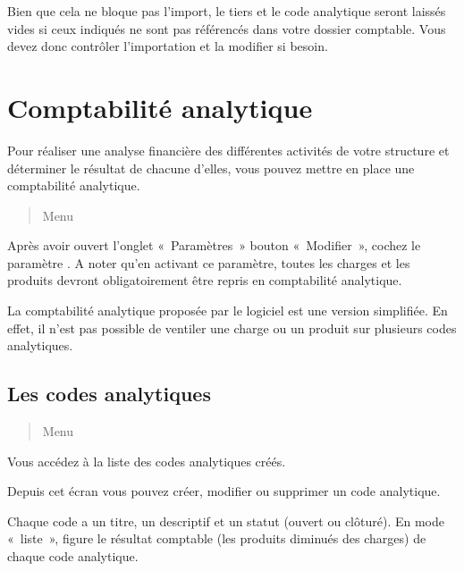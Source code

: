 \documentclass[a4paper,10pt,oneside,french]{sphinxmanual}
\begin{document}
\sphinxAtStartPar
Bien que cela ne bloque pas l’import, le tiers et le code analytique seront laissés vides si ceux indiqués ne sont pas référencés dans votre dossier comptable. Vous devez donc contrôler l’importation et la modifier si besoin.

\sphinxstepscope


\section{Comptabilité analytique}
\label{\detokenize{accounting/costaccounting:comptabilite-analytique}}\label{\detokenize{accounting/costaccounting::doc}}
\sphinxAtStartPar
Pour réaliser une analyse financière des différentes activités de votre structure et déterminer le résultat de chacune d’elles, vous pouvez mettre en place une comptabilité analytique.
\begin{quote}

\sphinxAtStartPar
Menu 
\end{quote}

\sphinxAtStartPar
Après avoir ouvert l’onglet « Paramètres » \sphinxhyphen{} bouton « Modifier », cochez le paramètre . A noter qu’en activant ce paramètre, toutes les charges et les produits devront obligatoirement être repris en comptabilité analytique.

\sphinxAtStartPar
La comptabilité analytique proposée par le logiciel est une version simplifiée. En effet, il n’est pas possible de ventiler une charge ou un produit sur plusieurs codes analytiques.


\subsection{Les codes analytiques}
\label{\detokenize{accounting/costaccounting:les-codes-analytiques}}\begin{quote}

\sphinxAtStartPar
Menu 
\end{quote}

\sphinxAtStartPar
Vous accédez à la liste des codes analytiques créés.

\sphinxAtStartPar
Depuis cet écran vous pouvez créer, modifier ou supprimer un code analytique.

\sphinxAtStartPar
Chaque code a un titre, un descriptif et un statut (ouvert ou clôturé).
En mode « liste », figure le résultat comptable (les produits diminués des charges) de chaque code analytique.
\begin{quote}

\noindent{}
\end{quote}
\end{document}
